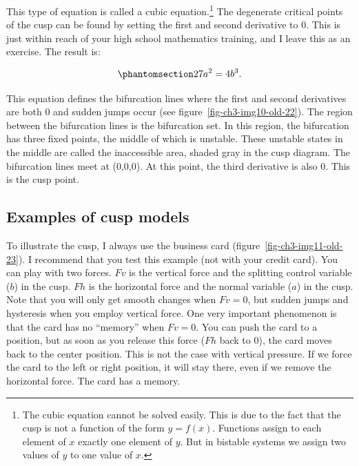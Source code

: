 \documentclass[
  a4paper,
  DIV=11,
  numbers=noendperiod,
  oneside]{scrreprt}
\begin{document}
This type of equation is called a cubic equation.\footnote{The cubic
  equation cannot be solved easily. This is due to the fact that the
  cusp is not a function of the form \(y = f(x)\). Functions assign to
  each element of \(x\) exactly one element of \(y\). But in bistable
  systems we assign two values of \(y\) to one value of \(x\).} The
degenerate critical points of the cusp can be found by setting the first
and second derivative to 0. This is just within reach of your high
school mathematics training, and I leave this as an exercise. The result
is:

\begin{equation}\phantomsection\label{eq-ch3-6-old-10}{
27a^{2} = 4b^{3}.
}\end{equation}

This equation defines the bifurcation lines where the first and second
derivatives are both 0 and sudden jumps occur (see
figure~\ref{fig-ch3-img10-old-22}). The region between the bifurcation
lines is the bifurcation set. In this region, the bifurcation has three
fixed points, the middle of which is unstable. These unstable states in
the middle are called the inaccessible area, shaded gray in the cusp
diagram. The bifurcation lines meet at (0,0,0). At this point, the third
derivative is also 0. This is the cusp point.

\subsection{Examples of cusp models}\label{sec-Examples-of-cusp-models}

To illustrate the cusp, I always use the business card
(figure~\ref{fig-ch3-img11-old-23}). I recommend that you test this
example (not with your credit card). You can play with two forces.
\(Fv\) is the vertical force and the splitting control variable (\(b\))
in the cusp. \(Fh\) is the horizontal force and the normal variable
(\(a\)) in the cusp. Note that you will only get smooth changes when
\(Fv = 0\), but sudden jumps and hysteresis when you employ vertical
force. One very important phenomenon is that the card has no ``memory''
when \(Fv = 0\). You can push the card to a position, but as soon as you
release this force (\(Fh\) back to 0), the card moves back to the center
position. This is not the case with vertical pressure. If we force the
card to the left or right position, it will stay there, even if we
remove the horizontal force. The card has a memory.
\end{document}
